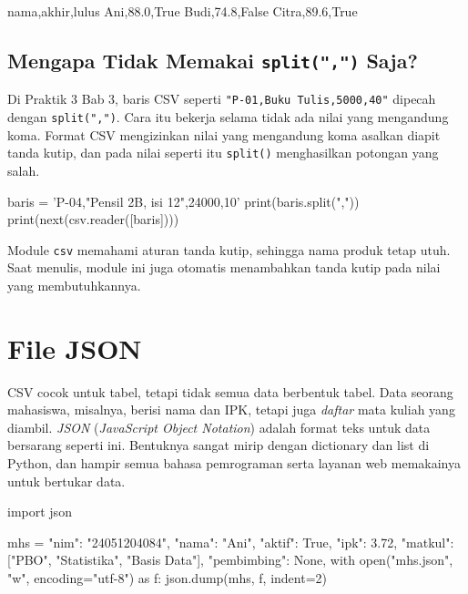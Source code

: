 \begin{keluaran}
nama,akhir,lulus
Ani,88.0,True
Budi,74.8,False
Citra,89.6,True
\end{keluaran}

\subsection{Mengapa Tidak Memakai \texttt{split(",")} Saja?}

Di Praktik 3 Bab 3, baris CSV seperti \texttt{"P-01,Buku Tulis,5000,40"} dipecah dengan \texttt{split(",")}. Cara itu bekerja selama tidak ada nilai yang mengandung koma. Format CSV mengizinkan nilai yang mengandung koma asalkan diapit tanda kutip, dan pada nilai seperti itu \texttt{split()} menghasilkan potongan yang salah.

\begin{kode}
baris = 'P-04,"Pensil 2B, isi 12",24000,10'
print(baris.split(","))
print(next(csv.reader([baris])))
\end{kode}

\begin{keluaran}
\end{keluaran}

Module \texttt{csv} memahami aturan tanda kutip, sehingga nama produk tetap utuh. Saat menulis, module ini juga otomatis menambahkan tanda kutip pada nilai yang membutuhkannya.

\section{File JSON}

CSV cocok untuk tabel, tetapi tidak semua data berbentuk tabel. Data seorang mahasiswa, misalnya, berisi nama dan IPK, tetapi juga \emph{daftar} mata kuliah yang diambil. \emph{JSON} (\emph{JavaScript Object Notation}) adalah format teks untuk data bersarang seperti ini. Bentuknya sangat mirip dengan dictionary dan list di Python, dan hampir semua bahasa pemrograman serta layanan web memakainya untuk bertukar data.

\begin{kode}
import json

mhs = {
    "nim": "24051204084",
    "nama": "Ani",
    "aktif": True,
    "ipk": 3.72,
    "matkul": ["PBO", "Statistika", "Basis Data"],
    "pembimbing": None,
}
with open("mhs.json", "w", encoding="utf-8") as f:
    json.dump(mhs, f, indent=2)
\end{kode}

